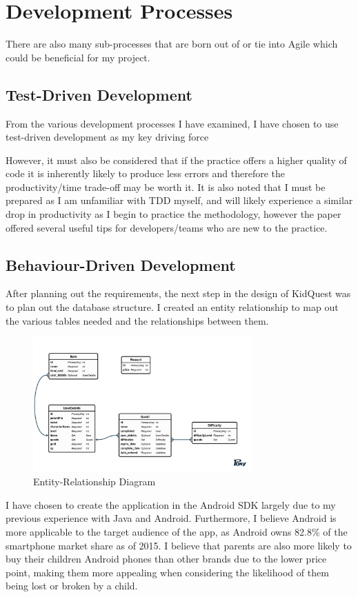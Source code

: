\section{Development Processes}
There are also many sub-processes that are born out of or tie into Agile which could be beneficial for my project.

\subsection{Test-Driven Development}
From the various development processes I have examined, I have chosen to use test-driven development as my key driving force 

However, it must also be considered that if the practice offers a higher quality of code it is inherently likely to produce less errors and therefore the productivity/time trade-off may be worth it.
It is also noted that I must be prepared as I am unfamiliar with TDD myself, and will likely experience a similar drop in productivity as I begin to practice the methodology, however the paper offered several useful tips for developers/teams who are new to the practice.

\subsection{Behaviour-Driven Development}
After planning out the requirements, the next step in the design of KidQuest was to plan out the database structure.
I created an entity relationship to map out the various tables needed and the relationships between them.

\begin{figure}[t]
	\centering
	\includegraphics[width=0.75\textwidth]{images/entityRelationshipDiagram.png}
	\caption{Entity-Relationship Diagram}
	\label{fig:ERD}
\end{figure}

I have chosen to create the application in the Android SDK largely due to my previous experience with Java and Android. 
Furthermore, I believe Android is more applicable to the target audience of the app, as Android owns 82.8\% of the smartphone market share as of 2015.
I believe that parents are also more likely to buy their children Android phones than other brands due to the lower price point, making them more appealing when considering the likelihood of them being lost or broken by a child.

